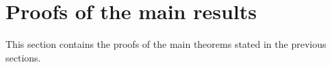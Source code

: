 \documentclass[sts,preprint,reqno,a4paper]{imsart}
\theoremstyle{plain}
\theoremstyle{remark}
\theoremstyle{definition}
\begin{document}
%
%


 
\section{Proofs of the main results}\label{section_proofs1}

This section contains the proofs of the main theorems stated in the previous sections.
\end{document}
